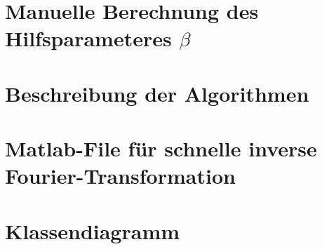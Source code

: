 \clearpage
\section{Manuelle Berechnung des Hilfsparameteres $\beta$}
\label{app:beta}


\clearpage
\section{Beschreibung der Algorithmen}
\label{app:algos}


\clearpage
\section{Matlab-File f\"ur schnelle inverse Fourier-Transformation}
\label{app:fftgut}


\clearpage
\section{Klassendiagramm}
\clearpage
\label{app:classdiagram}

